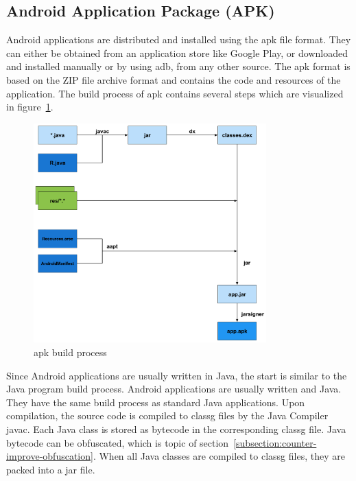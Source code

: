 \subsection{Android Application Package (APK)} \label{subsection:foundation-android-package}
Android applications are distributed and installed using the \gls{apk} file format.
They can either be obtained from an application store like Google Play, or downloaded and installed manually or by using \gls{adb}, from any other source.
The \gls{apk} format is based on the ZIP file archive format and contains the code and resources of the application.
\newline
The build process of \gls{apk} contains several steps which are visualized in figure~\ref{fig:apk}.
\newline
\begin{figure}[h]
    \centering
    \includegraphics[width=0.8\textwidth]{data/apk.png}
    \caption{\gls{apk} build process \cite{andevconDalvikART}}
    \label{fig:apk}
\end{figure}
Since Android applications are usually written in Java, the start is similar to the Java program build process.
Android applications are usually written and Java.
They have the same build process as standard Java applications.
Upon compilation, the source code is compiled to \gls{classg} files by the Java Compiler javac.
Each Java class is stored as bytecode in the corresponding \gls{classg} file.
Java bytecode can be obfuscated, which is topic of section~\ref{subsection:counter-improve-obfuscation}.
When all Java classes are compiled to \gls{classg} files, they are packed into a \gls{jar} file.
